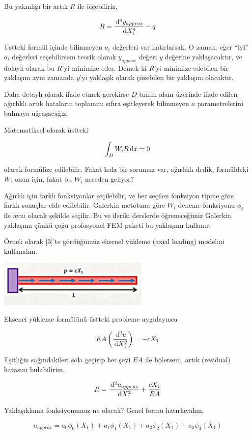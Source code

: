 \documentclass[12pt,fleqn]{article}\usepackage{../../common}
\begin{document}
Bu yakınlığı bir artık $R$ ile ölçebiliriz,

$$
R = \frac{\,\mathrm{d}^4 y_{approx}}{\,\mathrm{d} X_1^4} - q 
$$

Üstteki formül içinde bilinmeyen $a_i$ değerleri var hatırlarsak. O zaman, eğer
``iyi'' $a_i$ değerleri seçebilirsem teorik olarak $y_{approx}$ değeri $y$
değerine yaklaşacaktır, ve dolaylı olarak bu $R$'yi minimize eder. Demek ki
$R$'yi minimize edebilen bir yaklaşım aynı zamanda $y$'yi yaklaşık olarak
çözebilen bir yaklaşım olacaktır. 

Daha detaylı olarak ifade etmek gerekirse $D$ tanım alanı üzerinde ifade edilen
ağırlıklı artık hataların toplamını sıfıra eşitleyerek bilinmeyen $a$
parametrelerini bulmaya uğraşacağız.

Matematiksel olarak üstteki

$$
\int_D W_i R \,\mathrm{d} x = 0
$$

olarak formülize edilebilir. Fakat hala bir sorumuz var, ağırlıklı dedik,
formüldeki $W_i$ onun için, fakat bu $W_i$ nereden geliyor?

Ağırlık için farklı fonksiyonlar seçilebilir, ve her seçilen fonksiyon tipine
göre farklı sonuçlar elde edilebilir. Galerkin metotuna göre $W_i$ deneme
fonksiyonu $\phi_i$ ile aynı olacak şekilde seçilir. Bu ve ileriki derslerde
öğreneceğimiz Galerkin yaklaşımı çünkü çoğu profosyonel FEM paketi bu yaklaşımı
kullanır.

Örnek olarak [3]'te gördüğümüz eksenel yükleme (axial loading) modelini
kullanalım. 

\includegraphics[width=20em]{compscieng_bpp45fem1_01.jpg}

Eksenel yükleme formülünü üstteki probleme uygulayınca

$$
EA \left( \frac{\,\mathrm{d}^2 u}{\,\mathrm{d} X_1^2}  \right) = -c X_1
$$

Eşitliğin sağındakileri sola geçirip her şeyi $EA$ ile bölersem, artık
(residual) hatasını bulabilirim,

$$
R = \frac{\,\mathrm{d}^2 u_{approx}}{\,\mathrm{d} X_1^2} + \frac{c X_1}{EA}
$$

Yaklaşıklama fonksiyonumuz ne olacak? Genel formu hatırlayalım,

$$
u_{approx} = a_0 \phi_0(X_1) + a_1 \phi_1(X_1) + a_2 \phi_2(X_1) + a_3 \phi_3(X_1) 
$$
\end{document}
